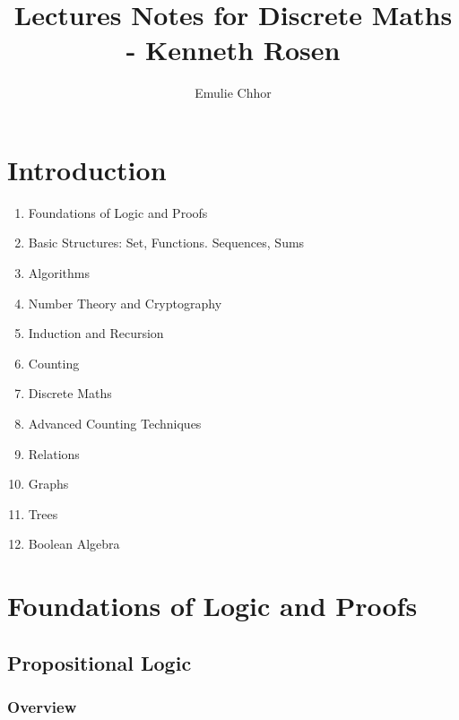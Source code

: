 \documentclass{article}
\begin{document}
\title{Lectures Notes for Discrete Maths - Kenneth Rosen}
\author{Emulie Chhor}
\maketitle

\section*{Introduction}

\begin{enumerate}
    \item Foundations of Logic and Proofs
    \item Basic Structures: Set, Functions. Sequences, Sums
    \item Algorithms
    \item Number Theory and Cryptography
    \item Induction and Recursion
    \item Counting
    \item Discrete Maths
    \item Advanced Counting Techniques
    \item Relations
    \item Graphs
    \item Trees
    \item Boolean Algebra
\end{enumerate}

\newtheorem{definition}{Definition}[subsection]
\newtheorem{theorem}{Theorem}[subsection]
\newtheorem{corollary}{Corollary}[subsection]
\newtheorem{lemma}[theorem]{Lemma}
\newtheorem{proposition}{Proposition}[section]
\newtheorem{axiom}{Axiome}
\newtheorem{property}{Propriété}[subsection]
\newtheorem*{remark}{Remarque}
\newtheorem*{problem}{Problème}
\newtheorem*{intuition}{Intuition}

\section{Foundations of Logic and Proofs}

\subsection{Propositional Logic}%
\label{sub:Propositional Logic}

\subsubsection{Overview}
\end{document}
